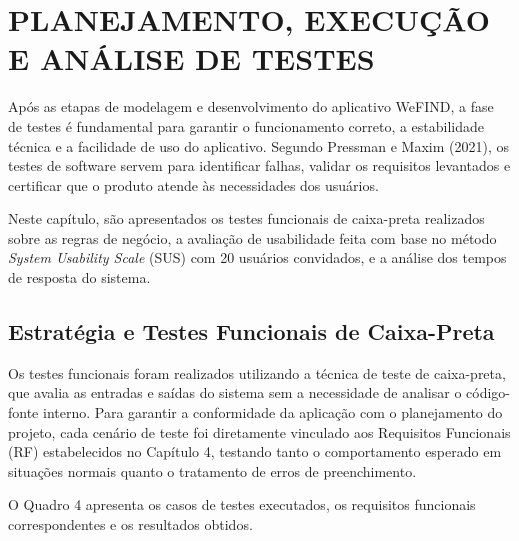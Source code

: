 \section{PLANEJAMENTO, EXECUÇÃO E ANÁLISE DE TESTES}

Após as etapas de modelagem e desenvolvimento do aplicativo WeFIND, a fase de testes é fundamental para garantir o funcionamento correto, a estabilidade técnica e a facilidade de uso do aplicativo. Segundo Pressman e Maxim (2021), os testes de software servem para identificar falhas, validar os requisitos levantados e certificar que o produto atende às necessidades dos usuários.

Neste capítulo, são apresentados os testes funcionais de caixa-preta realizados sobre as regras de negócio, a avaliação de usabilidade feita com base no método \textit{System Usability Scale} (SUS) com 20 usuários convidados, e a análise dos tempos de resposta do sistema.

\subsection{Estratégia e Testes Funcionais de Caixa-Preta}

Os testes funcionais foram realizados utilizando a técnica de teste de caixa-preta, que avalia as entradas e saídas do sistema sem a necessidade de analisar o código-fonte interno. Para garantir a conformidade da aplicação com o planejamento do projeto, cada cenário de teste foi diretamente vinculado aos Requisitos Funcionais (RF) estabelecidos no Capítulo 4, testando tanto o comportamento esperado em situações normais quanto o tratamento de erros de preenchimento.

O Quadro 4 apresenta os casos de testes executados, os requisitos funcionais correspondentes e os resultados obtidos.

